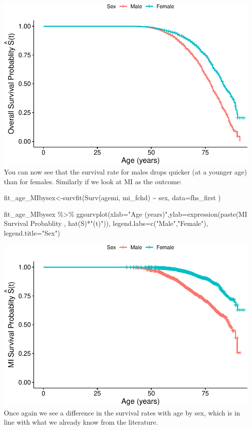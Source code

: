 \documentclass[
]{book}
\newenvironment{Shaded}{\begin{snugshade}}{\end{snugshade}}
\newcommand{\AttributeTok}[1]{\textcolor[rgb]{0.77,0.63,0.00}{#1}}
\newcommand{\FunctionTok}[1]{\textcolor[rgb]{0.00,0.00,0.00}{#1}}
\newcommand{\NormalTok}[1]{#1}
\newcommand{\OtherTok}[1]{\textcolor[rgb]{0.56,0.35,0.01}{#1}}
\newcommand{\SpecialCharTok}[1]{\textcolor[rgb]{0.00,0.00,0.00}{#1}}
\newcommand{\StringTok}[1]{\textcolor[rgb]{0.31,0.60,0.02}{#1}}
\begin{document}
\includegraphics{adv_epi_analysis_files/figure-latex/unnamed-chunk-196-2.pdf}
You can now see that the survival rate for males drops quicker (at a younger age) than for females.
Similarly if we look at MI as the outcome:

\begin{Shaded}
\begin{Highlighting}[]
\NormalTok{fit\_age\_MIbysex}\OtherTok{\textless{}{-}}\FunctionTok{survfit}\NormalTok{(}\FunctionTok{Surv}\NormalTok{(agemi, mi\_fchd) }\SpecialCharTok{\textasciitilde{}}\NormalTok{ sex, }\AttributeTok{data=}\NormalTok{fhs\_first )}

\NormalTok{fit\_age\_MIbysex }\SpecialCharTok{\%\textgreater{}\%}
\FunctionTok{ggsurvplot}\NormalTok{(}\AttributeTok{xlab=}\StringTok{"Age (years)"}\NormalTok{,}\AttributeTok{ylab=}\FunctionTok{expression}\NormalTok{(}\FunctionTok{paste}\NormalTok{(}\StringTok{\textquotesingle{}MI Survival Probablity \textquotesingle{}}\NormalTok{, }\FunctionTok{hat}\NormalTok{(S)}\SpecialCharTok{*}\StringTok{"(t)"}\NormalTok{)), }\AttributeTok{legend.labs=}\FunctionTok{c}\NormalTok{(}\StringTok{"Male"}\NormalTok{,}\StringTok{"Female"}\NormalTok{),}
  \AttributeTok{legend.title=}\StringTok{"Sex"}\NormalTok{)}
\end{Highlighting}
\end{Shaded}

\includegraphics{adv_epi_analysis_files/figure-latex/unnamed-chunk-197-1.pdf}
Once again we see a difference in the survival rates with age by sex, which is in line with what we already know from the literature.
\end{document}
